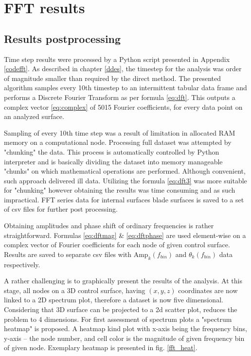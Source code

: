 
\section{FFT results} \label{fft}

\subsection{Results postprocessing} \label{fft_res_prep}
Time step results were processed by a Python script presented in Appendix \ref{codefft}. As described in chapter \ref{ddes}, the timestep for the analysis was order of magnitude smaller than required by the direct method. The presented algorithm samples every 10th timestep to an intermittent tabular data frame and performs a Discrete Fourier Transform as per formula \ref{eq:dft}. This outputs a complex vector \ref{eq:complex} of 5015 Fourier coefficients, for every data point on an analyzed surface.

Sampling of every 10th time step was a result of limitation in allocated RAM memory on a computational node. Processing full dataset was attempted by "chunking" the data. This process is automatically controlled by Python interpreter and is basically dividing the dataset into memory manageable "chunks" on which mathematical operations are performed. Although convenient, such approach delivered ill data. Utilizing the formula \ref{eq:dft3} was more suitable for "chunking" however obtaining the results was time consuming and as such impractical. FFT series data for internal surfaces blade surfaces is saved to a set of csv files for further post processing. 

Obtaining amplitudes and phase shift of ordinary frequencies is rather straightforward. Formulas \ref{eq:dftmag} \& \ref{eq:dftphase} are used element-wise on a complex vector of Fourier coefficients for each node of given control surface. Results are saved to separate csv files with $\text{Amp}_k(f_{bin})$ and $\theta_k(f_{bin})$ data respectively.

A rather challenging is to graphically present the results of the analysis. At this stage, all nodes on a 3D control surface, having $(x, y, z)$ coordinates are now linked to a 2D spectrum plot, therefore a dataset is now five dimensional. Considering that 3D surface can be projected to a 2d scatter plot, reduces the problem to 4 dimensions. For first assessment of spectrum plots a "spectrum heatmap" is proposed. A heatmap kind plot with x-axis being the frequency bins, y-axis -- the node number, and cell color is the magnitude of given frequency bin of given node. Exemplary heatmap is presented in fig. \ref{fft_heat}.

